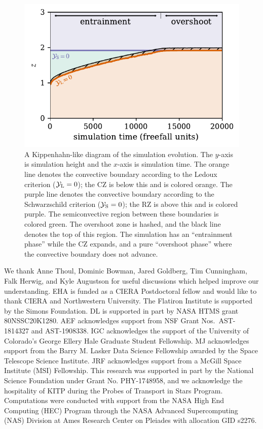 \documentclass[twocolumn, linenumbers, twocolappendix]{aastex631}
\newcommand{\yL}{\ensuremath{\mathcal{Y}_{\rm{L}}}}
\newcommand{\yS}{\ensuremath{\mathcal{Y}_{\rm{S}}}}
\begin{document}


\begin{figure}[t!]
\centering
\includegraphics[width=\columnwidth]{kippenhahn.pdf}
\caption{
    A Kippenhahn-like diagram of the simulation evolution.
    The $y$-axis is simulation height and the $x$-axis is simulation time.
    The orange line denotes the convective boundary according to the Ledoux criterion ($\yL = 0$); the CZ is below this and is colored orange.
    The purple line denotes the convective boundary according to the Schwarzschild criterion ($\yS = 0$); the RZ is above this and is colored purple.
    The semiconvective region between these boundaries is colored green.
    The overshoot zone is hashed, and the black line denotes the top of this region.
    The simulation has an ``entrainment phase'' while the CZ expands, and a pure ``overshoot phase'' where the convective boundary does not advance.
\label{fig:kippenhahn}
}
\end{figure}




\begin{acknowledgments}
We thank Anne Thoul, Dominic Bowman, Jared Goldberg, Tim Cunningham, Falk Herwig, and Kyle Augustson for useful discussions which helped improve our understanding.
EHA is funded as a CIERA Postdoctoral fellow and would like to thank CIERA and Northwestern University. 
The Flatiron Institute is supported by the Simons Foundation.
DL is supported in part by NASA HTMS grant 80NSSC20K1280.
AEF acknowledges support from NSF Grant Nos.~AST-1814327 and AST-1908338. 
IGC acknowledges the support of the University of Colorado’s George Ellery Hale Graduate Student Fellowship.
MJ acknowledges support from the Barry M. Lasker Data Science Fellowship awarded by the Space Telescope Science Institute.
JRF acknowledges support from a McGill Space Institute (MSI) Fellowship.
This research was supported in part by the National Science Foundation under Grant No. PHY-1748958, and we acknowledge the hospitality of KITP during the Probes of Transport in Stars Program.
Computations were conducted with support from the NASA High End Computing (HEC) Program through the NASA Advanced Supercomputing (NAS) Division at Ames Research Center on Pleiades with allocation GID s2276.
\end{acknowledgments}

\newpage
\appendix





                                                          	



\end{document}
